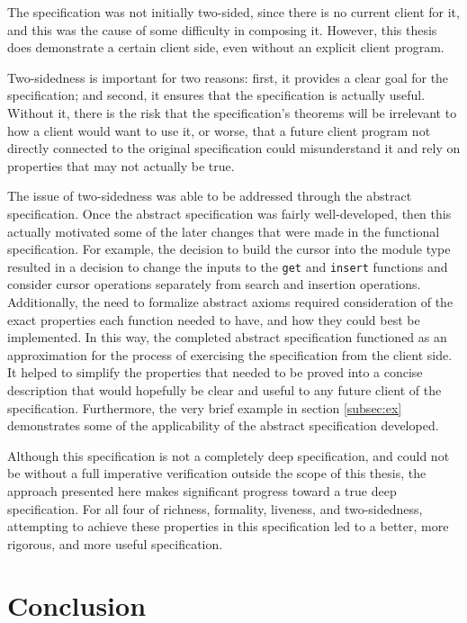 \documentclass[a4paper,12pt]{article}
\begin{document}
The specification was not initially two-sided, since there is no current client for it, and this was the cause of some difficulty in composing it. However, this thesis does demonstrate a certain client side, even without an explicit client program.

Two-sidedness is important for two reasons: first, it provides a clear goal for the specification; and second, it ensures that the specification is actually useful. Without it, there is the risk that the specification’s theorems will be irrelevant to how a client would want to use it, or worse, that a future client program not directly connected to the original specification could misunderstand it and rely on properties that may not actually be true.

The issue of two-sidedness was able to be addressed through the abstract specification. Once the abstract specification was fairly well-developed, then this actually motivated some of the later changes that were made in the functional specification. For example, the decision to build the cursor into the module type resulted in a decision to change the inputs to the \texttt{get} and \texttt{insert} functions and consider cursor operations separately from search and insertion operations. Additionally, the need to formalize abstract axioms required consideration of the exact properties each function needed to have, and how they could best be implemented. In this way, the completed abstract specification functioned as an approximation for the process of exercising the specification from the client side. It helped to simplify the properties that needed to be proved into a concise description that would hopefully be clear and useful to any future client of the specification. Furthermore, the very brief example in section \ref{subsec:ex} demonstrates some of the applicability of the abstract specification developed.

Although this specification is not a completely deep specification, and could not be without a full imperative verification outside the scope of this thesis, the approach presented here makes significant progress toward a true deep specification. For all four of richness, formality, liveness, and two-sidedness, attempting to achieve these properties in this specification led to a better, more rigorous, and more useful specification.

\clearpage

\section{Conclusion}
\end{document}
